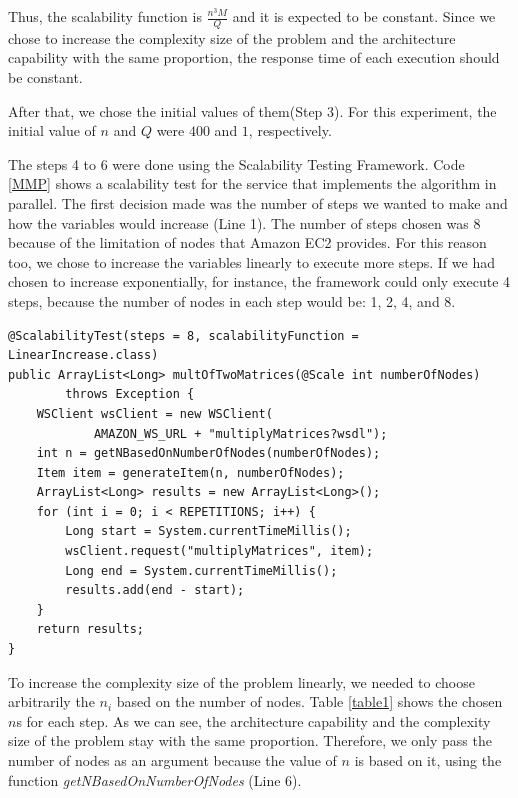 Thus, the scalability function is $\frac{n^3M}{Q}$ and it is expected to be constant. Since we chose to increase the complexity size of the problem and the architecture capability with the same proportion, the response time of each execution should be constant. 

After that, we chose the initial values of them(Step 3). For this experiment, the initial value of $n$ and $Q$ were $400$ and $1$, respectively. 

The steps 4 to 6 were done using the Scalability Testing Framework. Code \ref{MMP} shows a scalability test for the service that implements the algorithm in parallel. The first decision made was the number of steps we wanted to make and how the variables would increase (Line 1). The number of steps chosen was 8  because of the limitation of nodes that Amazon EC2 provides. For this reason too, we chose to increase the variables linearly to execute more steps. If we had chosen to increase exponentially, for instance, the framework could only execute 4 steps, because the number of nodes in each step would be: 1, 2, 4, and 8.

\begin{lstlisting}
@ScalabilityTest(steps = 8, scalabilityFunction = LinearIncrease.class)
public ArrayList<Long> multOfTwoMatrices(@Scale int numberOfNodes) 
		throws Exception {
	WSClient wsClient = new WSClient(
			AMAZON_WS_URL + "multiplyMatrices?wsdl");
	int n = getNBasedOnNumberOfNodes(numberOfNodes);
	Item item = generateItem(n, numberOfNodes);
	ArrayList<Long> results = new ArrayList<Long>();
	for (int i = 0; i < REPETITIONS; i++) {
		Long start = System.currentTimeMillis();
		wsClient.request("multiplyMatrices", item);
		Long end = System.currentTimeMillis();
		results.add(end - start);			
	}
	return results;
}
\end{lstlisting}

To increase the complexity size of the problem linearly, we needed to choose arbitrarily the $n_i$ based on the number of nodes. Table \ref{table1} shows the chosen $n$s for each step. As we can see, the architecture capability and the complexity size of the problem stay with the same proportion. Therefore, we only pass the number of nodes as an argument because the value of $n$ is based on it, using the function \emph{getNBasedOnNumberOfNodes} (Line 6).

